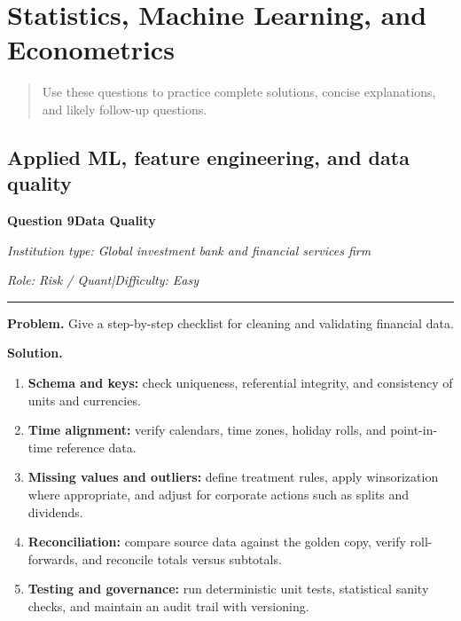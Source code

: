 \documentclass[11pt,letterpaper,openany]{book}
\newcommand{\ChapterIntro}[1]{%
  \begin{quote}\small #1\end{quote}%
}
\newcommand{\InterviewQuestionHeader}[5]{%
  \vspace{1.0em}%
  {\large\bfseries #1\enspace #4\par}%
  {\small\itshape Institution type: #2\par}%
  {\small\itshape Role: #3\enspace |\enspace Difficulty: #5\par}%
  \vspace{0.25em}\hrule\vspace{0.45em}%
}
\begin{document}
\section{Statistics, Machine Learning, and Econometrics}
\ChapterIntro{Use these questions to practice complete solutions, concise explanations, and likely follow-up questions.}

\subsection{Applied ML, feature engineering, and data quality}

\InterviewQuestionHeader{Question 9}{Global investment bank and financial services firm}{Risk / Quant}{Data Quality}{Easy}
\textbf{Problem.} Give a step-by-step checklist for cleaning and validating financial data.

\textbf{Solution.}

\begin{enumerate}
\item \textbf{Schema and keys:} check uniqueness, referential integrity, and consistency of units and currencies.
\item \textbf{Time alignment:} verify calendars, time zones, holiday rolls, and point-in-time reference data.
\item \textbf{Missing values and outliers:} define treatment rules, apply winsorization where appropriate, and adjust for corporate actions such as splits and dividends.
\item \textbf{Reconciliation:} compare source data against the golden copy, verify roll-forwards, and reconcile totals versus subtotals.
\item \textbf{Testing and governance:} run deterministic unit tests, statistical sanity checks, and maintain an audit trail with versioning.
\end{enumerate}
\end{document}
